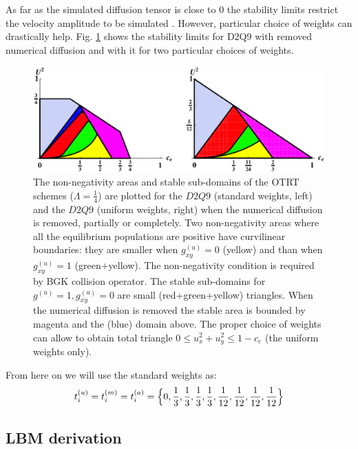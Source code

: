 \documentclass{article}
\begin{document}
As far as the simulated diffusion tensor is close to $0$ the stability limits restrict the velocity
amplitude to be simulated \cite{kuzmin-stability-optimal}. However, particular choice of weights
can drastically help. Fig. \ref{stability:d2q9} shows the stability limits for D2Q9 with removed
numerical diffusion and with it for two particular choices of weights.
\begin{figure}
\includegraphics[width=\textwidth]{Figures/d2q9_stability.eps}
\caption{The non-negativity areas and stable sub-domains of the OTRT schemes ($\Lambda=\frac{1}{4}$)
are plotted for the $D2Q9$ (standard weights, left) and the $D2Q9$ (uniform weights, right) when the
numerical diffusion is removed, partially or completely. Two non-negativity areas where all the
equilibrium populations are positive have curvilinear boundaries: they are smaller when
$g^{(u)}_{xy}=0$ (yellow) and than when $g^{(u)}_{xy}=1$ (green+yellow). The non-negativity
condition is required by BGK collision operator. The stable sub-domains for $g^{(u)} = 1,
g^{(u)}_{xy} = 0$ are small (red+green+yellow) triangles. When the numerical diffusion is removed
the stable area is bounded by magenta and the (blue) domain above. The proper choice of weights can
allow to obtain  total triangle $0 \leq u_x^2+u_y^2 \leq 1−c_e$ (the
uniform weights only).
\label{stability:d2q9}}
\end{figure}

From here on we will use the standard weights as:
\begin{equation}
t_i^{(u)}=t_i^{(m)}=t_i^{(a)}=\Bigl\{0,\frac{1}{3},\frac{1}{3},\frac{1}{3},\frac{1}{3},\frac{1}{12},
\frac {1}{12},\frac{1}{12},\frac{1}{12}\Bigr\}
\end{equation}

\subsection{LBM derivation}



\end{document}
